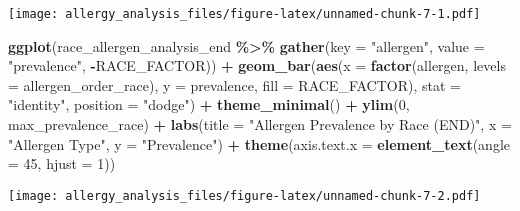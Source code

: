 \documentclass[
]{article}
\newenvironment{Shaded}{\begin{snugshade}}{\end{snugshade}}
\newcommand{\AttributeTok}[1]{\textcolor[rgb]{0.13,0.29,0.53}{#1}}
\newcommand{\DecValTok}[1]{\textcolor[rgb]{0.00,0.00,0.81}{#1}}
\newcommand{\FunctionTok}[1]{\textcolor[rgb]{0.13,0.29,0.53}{\textbf{#1}}}
\newcommand{\NormalTok}[1]{#1}
\newcommand{\SpecialCharTok}[1]{\textcolor[rgb]{0.81,0.36,0.00}{\textbf{#1}}}
\newcommand{\StringTok}[1]{\textcolor[rgb]{0.31,0.60,0.02}{#1}}
\begin{document}
\texttt{[image: allergy\_analysis\_files/figure-latex/unnamed-chunk-7-1.pdf]}

\begin{Shaded}
\begin{Highlighting}[]
\FunctionTok{ggplot}\NormalTok{(race\_allergen\_analysis\_end }\SpecialCharTok{\%\textgreater{}\%} 
       \FunctionTok{gather}\NormalTok{(}\AttributeTok{key =} \StringTok{"allergen"}\NormalTok{, }\AttributeTok{value =} \StringTok{"prevalence"}\NormalTok{, }\SpecialCharTok{{-}}\NormalTok{RACE\_FACTOR)) }\SpecialCharTok{+}
  \FunctionTok{geom\_bar}\NormalTok{(}\FunctionTok{aes}\NormalTok{(}\AttributeTok{x =} \FunctionTok{factor}\NormalTok{(allergen, }\AttributeTok{levels =}\NormalTok{ allergen\_order\_race), }
               \AttributeTok{y =}\NormalTok{ prevalence, }\AttributeTok{fill =}\NormalTok{ RACE\_FACTOR), }
           \AttributeTok{stat =} \StringTok{"identity"}\NormalTok{, }\AttributeTok{position =} \StringTok{"dodge"}\NormalTok{) }\SpecialCharTok{+}
  \FunctionTok{theme\_minimal}\NormalTok{() }\SpecialCharTok{+}
  \FunctionTok{ylim}\NormalTok{(}\DecValTok{0}\NormalTok{, max\_prevalence\_race) }\SpecialCharTok{+}
  \FunctionTok{labs}\NormalTok{(}\AttributeTok{title =} \StringTok{"Allergen Prevalence by Race (END)"}\NormalTok{,}
       \AttributeTok{x =} \StringTok{"Allergen Type"}\NormalTok{,}
       \AttributeTok{y =} \StringTok{"Prevalence"}\NormalTok{) }\SpecialCharTok{+}
  \FunctionTok{theme}\NormalTok{(}\AttributeTok{axis.text.x =} \FunctionTok{element\_text}\NormalTok{(}\AttributeTok{angle =} \DecValTok{45}\NormalTok{, }\AttributeTok{hjust =} \DecValTok{1}\NormalTok{))}
\end{Highlighting}
\end{Shaded}

\texttt{[image: allergy\_analysis\_files/figure-latex/unnamed-chunk-7-2.pdf]}
\end{document}
